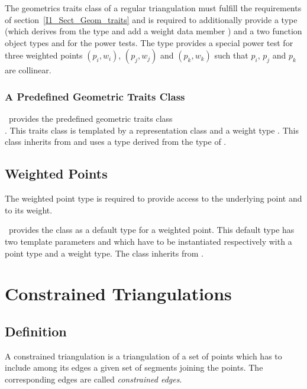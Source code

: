 
The geometrics traits class of a regular triangulation
must fulfill the requirements of section~\ref{I1_Sect_Geom_traits}
and is required to additionally provide  
a  type (which derives from the type  
and add a weight data member )
and a two function object types  and 
for the power tests. The type 
provides a special power test for three weighted points
 $(p_i, w_i)$, $(p_j, w_j)$ and $(p_k, w_k)$ such that
$p_i$, $p_j$ and $p_k$ are collinear.



\subsubsection{A Predefined Geometric Traits Class}
\cgal\ provides the predefined geometric traits class \\
.
This traits class is templated by a representation class 
and a weight type .
This class inherits from
and uses a  type
derived from the type  of
.



\subsection{Weighted Points}

The weighted point type  
is required to provide access to the underlying  point and to its weight.


\cgal\ provides the class 
as a default type for a  weighted point.
This default type has two template parameters 
and   which have to be instantiated respectively 
with a point type and a weight type.
The class 
 inherits from .




\section{Constrained Triangulations}
\label{I1_Sect_Constrained}


\subsection{Definition}
A constrained triangulation is a triangulation of a set of points
which has to include among its edges 
a given set of segments joining the points. The corresponding 
edges are called {\em constrained edges}. 


